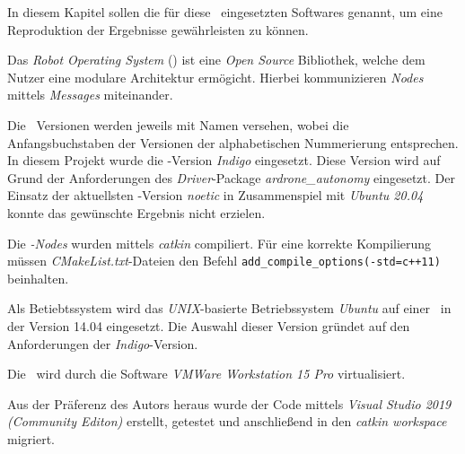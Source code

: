 
In diesem Kapitel sollen die für diese \Arbeit\ eingesetzten Softwares genannt, um eine Reproduktion der Ergebnisse gewährleisten zu können.




Das \textit{Robot Operating System} (\ROS) ist eine \textit{Open Source} Bibliothek, welche dem Nutzer eine modulare Architektur ermögicht.
Hierbei kommunizieren \textit{Nodes} mittels \textit{Messages} miteinander.

Die \ROS\ Versionen werden jeweils mit Namen versehen, wobei die Anfangsbuchstaben der Versionen der alphabetischen Nummerierung entsprechen. In diesem Projekt wurde die \ROS-Version \textit{Indigo} eingesetzt.
Diese Version wird auf Grund der Anforderungen des \textit{Driver}-Package \textit{ardrone\_autonomy} eingesetzt. Der Einsatz der aktuellsten \ROS-Version \textit{noetic} in Zusammenspiel mit \textit{Ubuntu 20.04} konnte das gewünschte Ergebnis nicht erzielen.

Die \ROS\textit{-Nodes} wurden mittels \textit{catkin} compiliert.
Für eine korrekte Kompilierung müssen \textit{CMakeList.txt}-Dateien den Befehl \texttt{add\_compile\_options(-std=c++11)} beinhalten.


Als Betiebtssystem wird das \textit{UNIX}-basierte Betriebssystem \textit{Ubuntu} auf einer \VM\ in der Version 14.04 eingesetzt.
Die Auswahl dieser Version gründet auf den Anforderungen der \ROS \textit{Indigo}-Version.

Die \VM\ wird durch die Software \textit{VMWare Workstation 15 Pro} virtualisiert.


Aus der Präferenz des Autors heraus wurde der Code mittels \textit{Visual Studio 2019 (Community Editon)} erstellt, getestet und anschließend in den \textit{catkin workspace} migriert.












